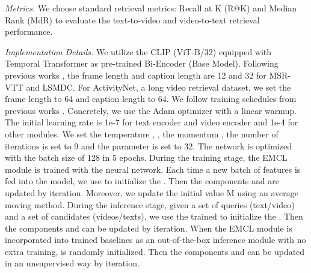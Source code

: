 \documentclass{article}
\newcommand{\mysubparagraph}[1]{\textit{#1}\hspace{1.8ex}}
\begin{document}
\mysubparagraph{Metrics.}
We choose standard retrieval metrics: Recall at K (R@K) and Median Rank (MdR) to evaluate the text-to-video and video-to-text retrieval performance.

\mysubparagraph{Implementation Details.}
We utilize the CLIP (ViT-B/32) \cite{radford2021learning} equipped with Temporal Transformer \cite{luo2021clip4clip} as pre-trained Bi-Encoder (Base Model). Following previous works \cite{luo2021clip4clip}, the frame length and caption length are 12 and 32 for MSR-VTT and LSMDC. For ActivityNet, a long video retrieval dataset, we set the frame length to 64 and caption length to 64. We follow training schedules from previous works \cite{luo2021clip4clip,cheng2021improving,wang2022disentangled}. Concretely, we use the Adam optimizer \cite{kingma2014adam} with a linear warmup. The initial learning rate is 1e-7 for text encoder and video encoder and 1e-4 for other modules. 
We set the temperature , , the momentum , the number of iterations is set to 9 and the parameter  is set to 32. The network is optimized with the batch size of 128 in 5 epochs. 
During the training stage, the EMCL module is trained with the neural network. Each time a new batch of features is fed into the model, we use  to initialize the . Then the components  and  are updated by iteration. Moreover, we update the initial value M using an average moving method.
During the inference stage, given a set of queries (text/video) and a set of candidates (videos/texts), we use the trained  to initialize the . Then the components  and  can be updated by iteration.
When the EMCL module is incorporated into trained baselines as an out-of-the-box inference module with no extra training,  is randomly initialized. Then the components  and  can be updated in an unsupervised way by iteration.
\end{document}
